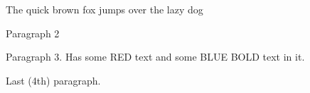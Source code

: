 \documentclass[11pt,a4paper]{article}
\begin{document}
The quick brown fox jumps over the lazy dog

Paragraph 2

Paragraph 3. Has some RED text and some BLUE BOLD text in it.

Last (4th) paragraph.
\end{document}
